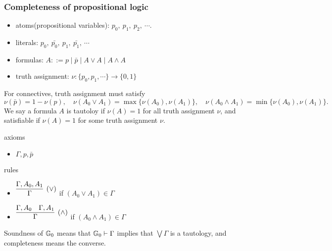 \documentclass{../../small}
\begin{document}
\subsubsection*{Completeness of propositional logic}
\begin{itemize}
\item atoms(propositional variables): $p_0,\ p_1,\ p_2,\ \cdots$.
\item literals: $p_0,\ \bar{p_0},\ p_1,\ \bar{p_1},\ \cdots$
\item formulas: $A::=p\mid\bar p\mid A\vee A\mid A\wedge A$
\item truth assignment: $\nu:\{p_0,p_1,\cdots\}\to\{0,1\}$
\end{itemize}

For connectives, truth assignment must satisfy
\[\nu(\bar p)=1-\nu(p),\quad\nu(A_0\vee A_1)=\max\{\nu(A_0),\nu(A_1)\},\quad\nu(A_0\wedge A_1)=\min\{\nu(A_0),\nu(A_1)\}.\]
We say a formula $A$ is tautoloy if $\nu(A)=1$ for all truth assignment $\nu$, and satisfiable if $\nu(A)=1$ for some truth assignment $\nu$.

\begin{defn*}
axioms
\begin{itemize}
\item $\Gamma,p,\bar p$
\end{itemize}
rules
\begin{itemize}
\item $\infer[(\vee)]{\Gamma}{\Gamma,A_0,A_1}$ if $(A_0\vee A_1)\in\Gamma$
\item $\infer[(\wedge)]{\Gamma}{\Gamma,A_0 & \Gamma,A_1}$ if $(A_0\wedge A_1)\in\Gamma$
\end{itemize}
\end{defn*}

Soundness of $\mathbb{G}_0$ means that $\mathbb{G}_0\vdash\Gamma$ implies that $\bigvee\Gamma$ is a tautology, and completeness means the converse.
\end{document}
